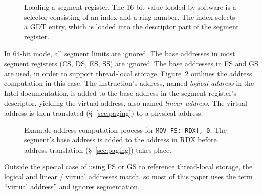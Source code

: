 \begin{figure}[hbt]
  \caption{
    Loading a segment register. The 16-bit value loaded by software is a
    selector consisting of an index and a ring number. The index selects a GDT
    entry, which is loaded into the descriptor part of the segment register.
  }
  \label{fig:cpu_segment}
\end{figure}

In 64-bit mode, all segment limits are ignored. The base addresses in most
segment registers (CS, DS, ES, SS) are ignored. The base addresses in FS and GS
are used, in order to support thread-local storage.
Figure~\ref{fig:cpu_segmentation} outlines the address computation in this
case. The instruction's address, named \textit{logical address} in the Intel
documentation, is added to the base address in the segment register's
descriptor, yielding the virtual address, also named \textit{linear address}.
The virtual address is then translated (\S~\ref{sec:paging}) to a physical
address.

\begin{figure}[hbt]
  \caption{
    Example address computation process for \texttt{MOV FS:[RDX], 0}.  The
    segment's base address is added to the address in RDX before address
    translation (\S~\ref{sec:paging}) takes place.
  }
  \label{fig:cpu_segmentation}
\end{figure}

Outside the special case of using FS or GS to reference thread-local storage,
the logical and linear / virtual addresses match, so most of this paper
uses the term ``virtual address'' and ignores segmentation.

